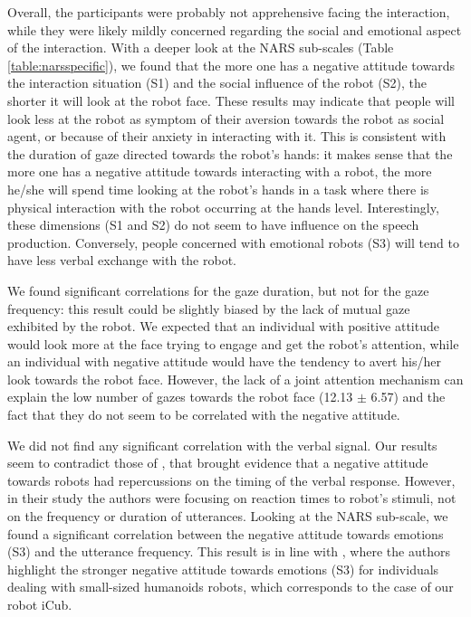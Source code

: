 Overall, the participants were probably not apprehensive facing the interaction, while they were likely mildly concerned regarding the social and emotional aspect of the interaction.
With a deeper look at the NARS sub-scales (Table \ref{table:narsspecific}), we found that the more one has a negative attitude towards the interaction situation (S1) and the social influence of the robot (S2), the shorter it will look at the robot face. 
These results may indicate that people will look less at the robot as symptom of their aversion towards the robot as social agent, or because of their anxiety in interacting with it. 
This is consistent with the duration of gaze directed towards the robot's hands: it makes sense that the more one has a negative attitude towards interacting with a robot, the more he/she will spend time looking at the robot's hands in a task where there is physical interaction with the robot occurring at the hands level.
Interestingly, these dimensions (S1 and S2) do not seem to have influence on the speech production. 
Conversely, people concerned with emotional robots (S3) will tend to have less verbal exchange with the robot. 

We found significant correlations for the gaze duration, but not for the gaze frequency: this result could be slightly biased by the lack of mutual gaze exhibited by the robot.
We expected that an individual with positive attitude would look more at the face trying to engage and get the robot's attention, while an individual with negative attitude would have the tendency to avert his/her look towards the robot face.
However, the lack of a joint attention mechanism can explain the low number of gazes towards the robot face (12.13 $\pm$ 6.57) and the fact that they do not seem to be correlated with the negative attitude.

We did not find any significant correlation with the verbal signal.
Our results seem to contradict those of \cite{Nomura2008}, that brought evidence that a negative attitude towards robots had repercussions on the timing of the verbal response. However, in their study the authors were focusing on reaction times to robot's stimuli, not on the frequency or duration of utterances.
Looking at the NARS sub-scale, we found a significant correlation between the negative attitude towards emotions (S3) and the utterance frequency. This result is in line with \cite{NARS2006}, where the authors highlight the stronger negative attitude towards emotions (S3) for individuals dealing with small-sized humanoids robots, which corresponds to the case of our robot iCub.

